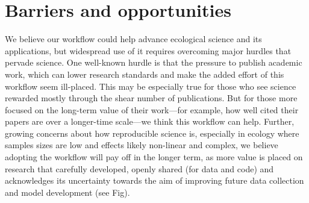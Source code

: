 \documentclass[11pt]{article}
\begin{document}
\section{Barriers and opportunities}

We believe our workflow could help advance ecological science and its applications, but widespread use of it requires overcoming major hurdles that pervade science.  
One well-known hurdle is that the pressure to publish academic work, which can lower research standards and make the added effort of this workflow seem ill-placed. This may be especially true for those who see science rewarded mostly through the shear number of publications. But for those more focused on the long-term value of their work---for example, how well cited their papers are over a longer-time scale---we think this workflow can help. Further, growing concerns about how reproducible science is, especially in ecology where samples sizes are low and effects likely non-linear and complex, we believe adopting the workflow will pay off in the longer term, as more value is placed on research that carefully developed, openly shared (for data and code) and acknowledges its uncertainty towards the aim of improving future data collection and model development (see Fig). 
\end{document}

